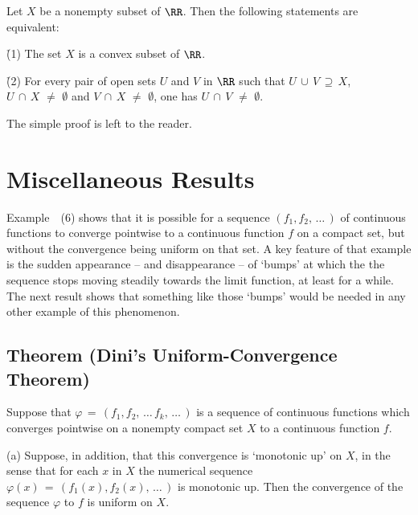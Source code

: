 \V

        Let $X$ be a nonempty subset of ${\RR}$. Then the following statements are equivalent:

\V

        \h (1) The set $X$ is a convex subset of ${\RR}$.

        \h (2) For every pair of open sets $U$ and $V$ in ${\RR}$ such that $U\,{\cup}\,V \,{\supseteq}\, X$, $U\,{\cap}\,X \,\,{\neq}\,\, {\emptyset}$ and $V\,{\cap}\,X \,\,{\neq}\,\, {\emptyset}$, one has $U\,{\cap}\,V \,\,{\neq}\,\, {\emptyset}$.

\V

        The simple proof is left to the reader.

\V
\V

                \section{{\bf Miscellaneous Results}}
                \label{SectF35}

\V
\V

        Example~~(6) shows that it is possible for a sequence $(f_{1},f_{2},\,{\ldots}\,)$ of continuous functions
    to converge pointwise to a continuous function $f$ on a compact set, but without the convergence being uniform on that set.
    A key feature of that example is the sudden appearance -- and disappearance -- of `bumps' at which the the sequence stops moving steadily towards the limit function, at least for a while.
    The next result shows that something like those `bumps' would be needed in any other example of this phenomenon.

\V


             \subsection{\small{\bf Theorem} (Dini's Uniform-Convergence Theorem)}
            \label{ThmF35.20}

\V

        Suppose that ${\varphi} \,=\, (f_{1},f_{2},\,{\ldots}\,f_{k},\,{\ldots}\,)$ is a sequence of continuous functions
    which converges pointwise on a nonempty compact set $X$ to a continuous function $f$.

\V


        (a) Suppose, in addition, that this convergence is `monotonic up' on $X$, in the sense that for each $x$ in $X$ the numerical sequence 
    ${\varphi}(x) \,=\, (f_{1}(x),f_{2}(x),\,{\ldots}\,)$ is monotonic up. Then the convergence of the sequence ${\varphi}$ to $f$ is uniform on $X$.

